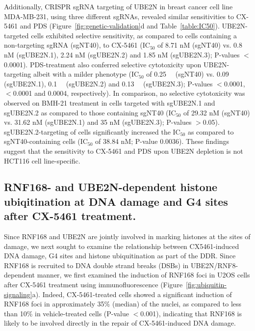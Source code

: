 Additionally, CRISPR sgRNA targeting of UBE2N in breast cancer cell line MDA-MB-231, using three different sgRNAs, revealed similar sensitivities to CX-5461 and PDS (Figure~\ref{fig:genetic-validation}d and Table~\ref{table:IC50}). UBE2N-targeted cells exhibited selective sensitivity, as compared to cells containing a non-targeting sgRNA (sgNT40), to CX-5461 (IC$_{50}$ of 8.71 nM (sgNT40) vs. 0.8 nM (sgUBE2N.1), 2.24 nM (sgUBE2N.2) and 1.85 nM (sgUBE2N.3); P-values $<$0.0001). 
PDS-treatment also conferred selective cytotoxicity upon UBE2N-targeting albeit with a milder phenotype (IC$_{50}$ of \SI{0.25}{\micro\Molar} (sgNT40) vs. \SI{0.09}{\micro\Molar} (sgUBE2N.1), \SI{0.1}{\micro\Molar} (sgUBE2N.2) and \SI{0.13}{\micro\Molar} (sgUBE2N.3); P-values $<$0.0001, $<$0.0001 and 0.0004, respectively). 
In comparison, no selective cytotoxicity was observed on BMH-21 treatment in cells targeted with sgUBE2N.1 and sgUBE2N.2 as compared to those containing sgNT40 (IC$_{50}$ of 29.32 nM (sgNT40) vs. 31.62 nM (sgUBE2N.1) and 35 nM (sgUBE2N.3); P-values $>$0.05). 
sgUBE2N.2-targeting of cells significantly increased the IC$_{50}$ as compared to sgNT40-containing cells (IC$_{50}$ of 38.84 nM; P-value 0.0036). 
These findings suggest that the sensitivity to CX-5461 and PDS upon UBE2N depletion is not HCT116 cell line-specific. 

\subsection{RNF168- and UBE2N-dependent histone ubiqitination at DNA damage and G4 sites after CX-5461 treatment.}

Since RNF168 and UBE2N are jointly involved in marking histones at the sites of damage, we next sought to examine the relationship between CX5461-induced DNA damage, G4 sites and histone ubiquitination as part of the DDR.
Since RNF168 is recruited to DNA double strand breaks (DSBs) in UBE2N/RNF8-dependent manner, we first examined the induction of RNF168 foci in U2OS cells after CX-5461 treatment using immunofluorescence (Figure~\ref{fig:ubiquitin-signaling}a). 
Indeed, CX-5461-treated cells showed a significant induction of RNF168 foci in approximately 35\% (median) of the nuclei, as compared to less than 10\% in vehicle-treated cells (P-value $<$0.001), indicating that RNF168 is likely to be involved directly in the repair of CX-5461-induced DNA damage.

